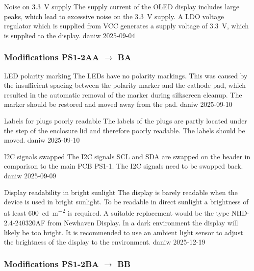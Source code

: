 \begin{ModTable}

\ModItemDone
{Noise on \qty{3.3}{\volt} supply}
{The supply current of the \ac{OLED} display includes large peaks, which lead to excessive noise on the \qty{3.3}{\volt} supply. }
{A \ac{LDO} voltage regulator which is supplied from VCC generates a supply voltage of \qty{3.3}{\volt}, which is supplied to the display. }
{daniw}
{2025-09-04}

\end{ModTable}

\FloatBarrier

\subsubsection{Modifications PS1-2AA $\to$ BA}

\begin{ModTable}

\ModItemDone
{LED polarity marking}
{The LEDs have no polarity markings. This was caused by the insufficient spacing between the polarity marker and the cathode pad, which resulted in the automatic removal of the marker during silkscreen cleanup. }
{The marker should be restored and moved away from the pad. }
{daniw}
{2025-09-10}

\ModItemDone
{Labels for plugs poorly readable}
{The labels of the plugs are partly located under the step of the enclosure lid and therefore poorly readable. }
{The labels should be moved. }
{daniw}
{2025-09-10}

\ModItemDone
{\acs{I2C} signals swapped}
{The \ac{I2C} signals SCL and SDA are swapped on the header in comparison to the main PCB PS1-1. }
{The \ac{I2C} signals need to be swapped back. }
{daniw}
{2025-09-09}

\ModItemDone
{Display readability in bright sunlight}
{The display is barely readable when the device is used in bright sunlight. }
{To be readable in direct sunlight a brightness of at least \qty{600}{\candela\per\square\meter} is required. A suitable replacement would be the type NHD-2.4-240320AF from Newhaven Display. In a dark environment the display will likely be too bright. It is recommended to use an ambient light sensor to adjust the brightness of the display to the environment. }
{daniw}
{2025-12-19}

\end{ModTable}

\FloatBarrier

\subsubsection{Modifications PS1-2BA $\to$ BB}


